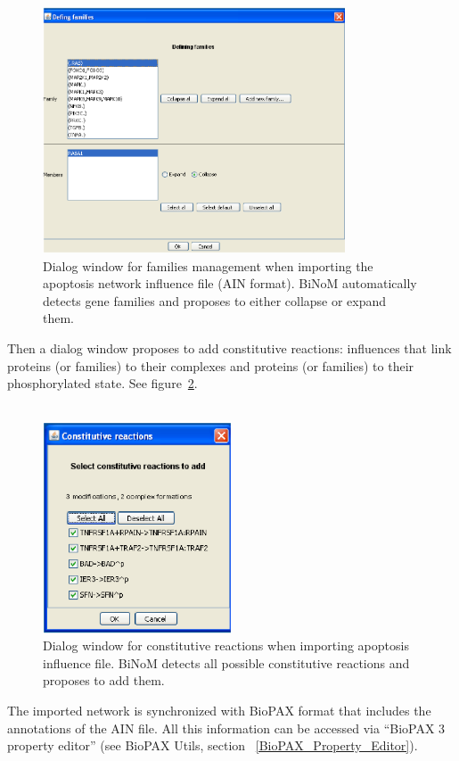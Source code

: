 \begin{figure}
\centering
\includegraphics[width=0.8\textwidth]{graphics/AIN_dialog_for_families_management}
\caption{Dialog window for families management when importing the apoptosis network influence file (AIN format). BiNoM automatically detects gene families and proposes to either collapse or expand them.}
\label{AIN_dialog_for_families_management}
\end{figure}

Then a dialog window proposes to add constitutive reactions: influences that
link proteins (or families) to their complexes and proteins (or families) to
their phosphorylated state. See
figure~\ref{AIN_dialog_for_constitutive_reactions}.\\\\

\begin{figure}
\centering
\includegraphics[width=0.5\textwidth]{graphics/AIN_dialog_for_constitutive_reactions}
\caption{Dialog window for constitutive reactions when importing apoptosis influence file. BiNoM detects all possible constitutive reactions and proposes to add them.}
\label{AIN_dialog_for_constitutive_reactions}
\end{figure}
The imported network is synchronized with BioPAX format that includes the annotations of the AIN file. All this information can be accessed via “BioPAX 3 property editor” (see BioPAX Utils, section ~\ref{BioPAX_Property_Editor}).



